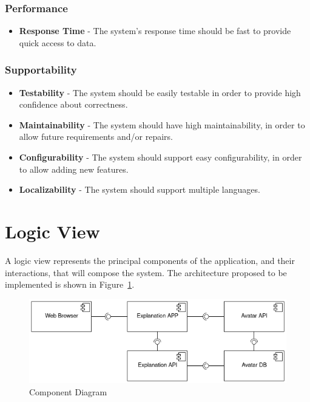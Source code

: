 \subsubsection{Performance}

\begin{itemize}
    \item \textbf{Response Time} - The system's response time should be fast to provide quick access to data.
\end{itemize}

\subsubsection{Supportability}

\begin{itemize}
    \item \textbf{Testability} - The system should be easily testable in order to provide high confidence about correctness.
    \item \textbf{Maintainability} - The system should have high maintainability, in order to allow future requirements and/or repairs.
    \item \textbf{Configurability} - The system should support easy configurability, in order to allow adding new features.
    \item \textbf{Localizability} - The system should support multiple languages.
\end{itemize}

\section{Logic View}

A logic view represents the principal components of the application, and their interactions, that will compose the system.
The architecture proposed to be implemented is shown in Figure~\ref{fig:cd}.

\begin{figure}[H]
\centering
\includegraphics[width=\textwidth,keepaspectratio]{ch4/assets/component_diagram.png}
\caption[Component Diagram]{Component Diagram}
\label{fig:cd}
\end{figure}

